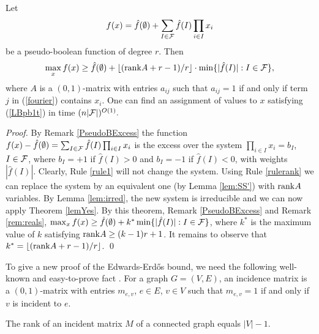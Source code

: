 \documentclass{llncs}
\begin{document}
\begin{theorem}\label{thm:PBB}
Let \begin{equation}\label{fourier} f(x)=\hat{f}(\emptyset) + \sum_{I\in {\cal F}}\hat{f}(I)\prod_{i\in I}x_i\end{equation} be a pseudo-boolean function of degree $r$. Then
\begin{equation}\label{LBpb1t}\max_x f(x)\ge \hat{f}(\emptyset) + \lfloor ({\rm rank} A +r -1)/r\rfloor \cdot \min \{|\hat{f}(I)|: I\in {\cal F}\},\end{equation} where $A$ is a $(0,1)$-matrix with entries $a_{ij}$ such that $a_{ij}=1$ if and only if term $j$ in (\ref{fourier}) contains $x_i.$ One can find an assignment of values to $x$ satisfying (\ref{LBpb1t}) in time $(n|{\cal F}|)^{O(1)}.$
\end{theorem}
\begin{proof}
By Remark \ref{PseudoBExcess} the function $f(x) - \hat{f}(\emptyset) =\sum_{I\in {\cal F}}\hat{f}(I)\prod_{i\in I}x_i$ is the excess over the system $\prod_{i\in I}x_i=b_I$, $I\in {\cal F}$, where $b_I=+1$ if $\hat{f}(I)>0$ and $b_I=-1$ if $\hat{f}(I)<0$, with weights $|\hat{f}(I)|.$ Clearly, Rule \ref{rule1} will not change the system.
Using Rule \ref{rulerank} we can replace the system by an equivalent one (by Lemma \ref{lem:SS'}) with ${\rm rank} A$ variables. By Lemma \ref{lem:irred}, the new system is irreducible and we can now apply Theorem \ref{lemYes}. By this theorem, Remark \ref{PseudoBExcess} and Remark \ref{rem:reals}, $\max_x f(x)\ge  \hat{f}(\emptyset)+k^*\min \{|\hat{f}(I)|: I\in {\cal F}\}$, where $k^*$ is the maximum value of $k$ satisfying ${\rm rank} A\ge (k-1)r+1$. It remains to observe that $k^*=\lfloor ({\rm rank} A +r -1)/r\rfloor$.
\qed \end{proof}

To give a new proof of the Edwards-Erd{\H o}s bound, we need the following well-known and easy-to-prove fact \cite{BonMur2008}. For a graph $G=(V,E)$, an incidence matrix is a $(0,1)$-matrix with entries $m_{e,v}$, $e\in E$, $v\in V$ such that $m_{e,v}=1$ if and only if $v$ is incident to $e$.

\begin{lemma}\label{lem:M}
The rank of an incident matrix $M$ of a connected graph equals $|V|-1.$
\end{lemma}

\end{document}
